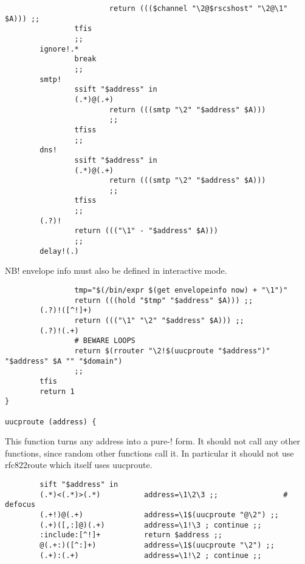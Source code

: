 \begin{tscreen}
\begin{verbatim}
                        return ((($channel "\2@$rscshost" "\2@\1" $A))) ;;
                tfis
                ;;
        ignore!.*
                break
                ;;
        smtp!
                ssift "$address" in
                (.*)@(.+)
                        return (((smtp "\2" "$address" $A)))
                        ;;
                tfiss
                ;;
        dns!
                ssift "$address" in
                (.*)@(.+)
                        return (((smtp "\2" "$address" $A)))
                        ;;
                tfiss
                ;;
        (.?)!
                return ((("\1" - "$address" $A)))
                ;;
        delay!(.)
\end{verbatim}
\end{tscreen}


NB! envelope info must also be defined in interactive mode.

\begin{tscreen}
\begin{verbatim}
                tmp="$(/bin/expr $(get envelopeinfo now) + "\1")"
                return (((hold "$tmp" "$address" $A))) ;;
        (.?)!([^!]+)
                return ((("\1" "\2" "$address" $A))) ;;
        (.?)!(.+)
                # BEWARE LOOPS
                return $(rrouter "\2!$(uucproute "$address")" "$address" $A "" "$domain")
                ;;
        tfis
        return 1
}

uucproute (address) {
\end{verbatim}
\end{tscreen}


This function turns any address into a pure-! form.  It should not
call any other functions, since random other functions call it.
In particular it should not use rfc822route which itself uses
uucproute.

\begin{tscreen}
\begin{verbatim}
        sift "$address" in
        (.*)<(.*)>(.*)          address=\1\2\3 ;;               # defocus
        (.+!)@(.+)              address=\1$(uucproute "@\2") ;;
        (.+)([,:]@)(.+)         address=\1!\3 ; continue ;;
        :include:[^!]+          return $address ;;
        @(.+:)([^:]+)           address=\1$(uucproute "\2") ;;
        (.+):(.+)               address=\1!\2 ; continue ;;
\end{verbatim}
\end{tscreen}


